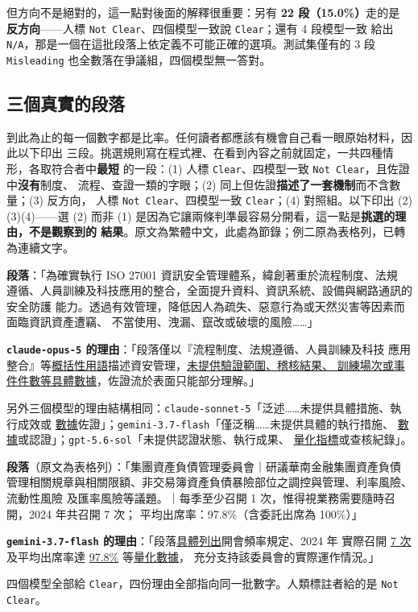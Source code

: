 \documentclass[11pt,a4paper]{ctexart}
\newcommand{\fn}[1]{\texttt{#1}}
\begin{document}
\medskip
但方向不是絕對的，這一點對後面的解釋很重要：另有 \textbf{22 段（15.0\%）}走的是
\textbf{反方向}——人標 \fn{Not Clear}、四個模型一致說 \fn{Clear}；還有 4 段模型一致
給出 \fn{N/A}，那是一個在這批段落上依定義不可能正確的選項。測試集僅有的 3 段
\fn{Misleading} 也全數落在爭議組，四個模型無一答對。

\subsection{三個真實的段落}
\label{sec:examples}

到此為止的每一個數字都是比率。任何讀者都應該有機會自己看一眼原始材料，因此以下印出
三段。挑選規則寫在程式裡、在看到內容之前就固定，一共四種情形，各取符合者中\textbf{最短}
的一段：(1) 人標 \fn{Clear}、四模型一致 \fn{Not Clear}，且佐證中\textbf{沒有}制度、
流程、查證一類的字眼；(2) 同上但佐證\textbf{描述了一套機制}而不含數量；(3) 反方向，
人標 \fn{Not Clear}、四模型一致 \fn{Clear}；(4) 對照組。以下印出 (2)(3)(4)——選 (2)
而非 (1) 是因為它讓兩條判準最容易分開看，這一點是\textbf{挑選的理由，不是觀察到的
結果}。原文為繁體中文，此處為節錄；例二原為表格列，已轉為連續文字。

\begin{tcolorbox}[colback=yellow!6, colframe=yellow!55!black, breakable,
  title=例一（\fn{id 13391}）　人類標註 \fn{Clear}　四個模型一致 \fn{Not Clear}]
\small
\textbf{段落}：「為確實執行 ISO 27001 資訊安全管理體系，緯創著重於流程制度、法規
遵循、人員訓練及科技應用的整合，全面提升資料、資訊系統、設備與網路通訊的安全防護
能力。透過有效管理，降低因人為疏失、惡意行為或天然災害等因素而面臨資訊資產遭竊、
不當使用、洩漏、竄改或破壞的風險……」

\smallskip
\textbf{\fn{claude-opus-5} 的理由}：「段落僅以『流程制度、法規遵循、人員訓練及科技
應用整合』等\underline{概括性用語}描述資安管理，\underline{未提供驗證範圍、稽核結果、
訓練場次或事件件數等具體數據}，佐證流於表面只能部分理解。」

\smallskip
另外三個模型的理由結構相同：\fn{claude-sonnet-5}「泛述……未提供具體措施、執行成效或
\underline{數據}佐證」；\fn{gemini-3.7-flash}「僅泛稱……未提供具體的執行措施、
\underline{數據}或認證」；\fn{gpt-5.6-sol}「未提供認證狀態、執行成果、
\underline{量化指標}或查核紀錄」。
\end{tcolorbox}

\begin{tcolorbox}[colback=yellow!6, colframe=yellow!55!black, breakable,
  title=例二（\fn{id 13846}）　人類標註 \fn{Not Clear}　四個模型一致 \fn{Clear}]
\small
\textbf{段落}（原文為表格列）：「集團資產負債管理委員會｜研議華南金融集團資產負債
管理相關規章與相關限額、非交易簿資產負債暴險部位之調控與管理、利率風險、流動性風險
及匯率風險等議題。｜每季至少召開 1 次，惟得視業務需要隨時召開，2024 年共召開 7 次；
平均出席率：97.8\%（含委託出席為 100\%）」

\smallskip
\textbf{\fn{gemini-3.7-flash} 的理由}：「段落\underline{具體列出}開會頻率規定、2024 年
實際召開 \underline{7 次}及平均出席率達 \underline{97.8\%} 等\underline{量化數據}，
充分支持該委員會的實際運作情況。」

\smallskip
四個模型全部給 \fn{Clear}，四份理由全部指向同一批數字。人類標註者給的是
\fn{Not Clear}。
\end{tcolorbox}
\end{document}
